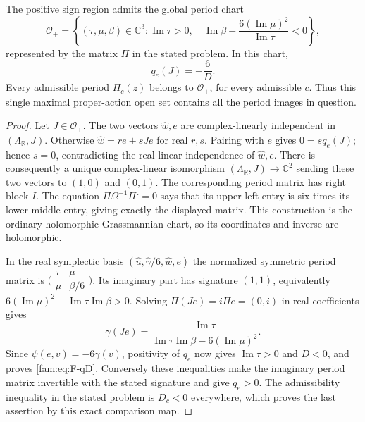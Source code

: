 \begin{proposition}\label{fam:src:F.2.3}\label{fam:st:F.2.3}
The positive sign region admits the global period chart
\[
 \mathcal O_+=\left\{
 (\tau,\mu,\beta)\in\mathbb C^3:
 \operatorname{Im}\tau>0,\quad
 \operatorname{Im}\beta-\frac{6(\operatorname{Im}\mu)^2}
 {\operatorname{Im}\tau}<0\right\},
\]
represented by the matrix $\Pi$ in the stated problem.  In this chart,
\begin{equation}\label{fam:eq:F-qD}
 q_e(J)=-\frac6D.
\end{equation}
Every admissible period $\Pi_c(z)$ belongs to $\mathcal O_+$, for every
admissible $c$.  Thus this single maximal proper-action open set contains
all the period images in question.
\end{proposition}


\begin{proof}
Let $J\in\mathcal O_+$.  The two vectors $\widehat w,e$ are complex-linearly
independent in $(\Lambda_{\mathbb R},J)$.  Otherwise
$\widehat w=r e+sJe$ for real $r,s$.  Pairing with $e$ gives
$0=sq_e(J)$; hence $s=0$, contradicting the real linear independence
of $\widehat w,e$.  There is consequently a unique complex-linear
isomorphism $(\Lambda_{\mathbb R},J)\to\mathbb C^2$ sending these two
vectors to $(1,0)$ and $(0,1)$.  The corresponding period matrix has
right block $I$.  The equation
$\Pi\Omega^{-1}\Pi^{\mathsf t}=0$ says that its upper left entry is
six times its lower middle entry, giving exactly the displayed matrix.
This construction is the ordinary holomorphic Grassmannian chart,
so its coordinates and inverse are holomorphic.

In the real symplectic basis
$(\widehat u,\widehat\gamma/6,\widehat w,e)$ the normalized symmetric
period matrix is
$\bigl(\begin{smallmatrix}\tau&\mu\\\mu&\beta/6\end{smallmatrix}\bigr)$.
Its imaginary part has signature $(1,1)$, equivalently
$6(\operatorname{Im}\mu)^2-
\operatorname{Im}\tau\operatorname{Im}\beta>0$.
Solving $\Pi(Je)=i\Pi e=(0,i)$ in real coefficients gives
\[
 \gamma(Je)=
 \frac{\operatorname{Im}\tau}
 {\operatorname{Im}\tau\operatorname{Im}\beta-
 6(\operatorname{Im}\mu)^2}.
\]
Since $\psi(e,v)=-6\gamma(v)$, positivity of $q_e$ now gives
$\operatorname{Im}\tau>0$ and $D<0$, and proves \eqref{fam:eq:F-qD}.
Conversely these inequalities make the imaginary period matrix
invertible with the stated signature and give $q_e>0$.  The admissibility
inequality in the stated problem is $D_c<0$ everywhere, which proves the last
assertion by this exact comparison map.
\end{proof}

